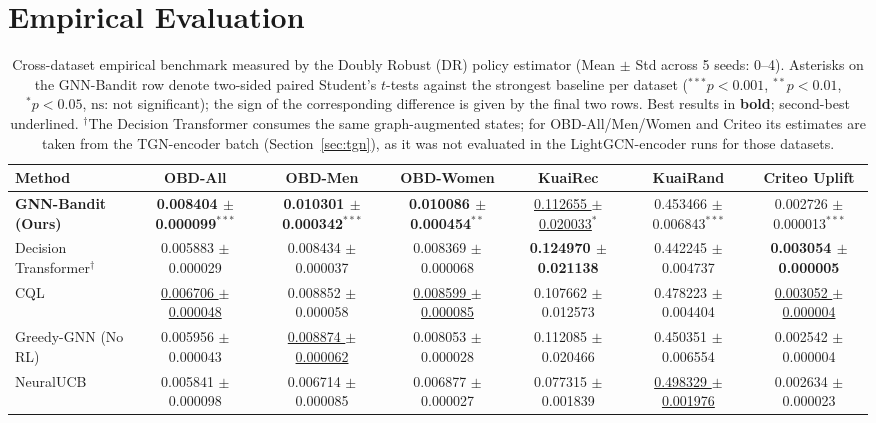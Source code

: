 \documentclass[preprint,12pt,3p]{elsarticle}
\begin{document}
\section{Empirical Evaluation}
\label{sec:experiments}

\begin{table}[t]
\centering
\small
\caption{Cross-dataset empirical benchmark measured by the Doubly Robust (DR) policy estimator (Mean $\pm$ Std across 5 seeds: 0--4). Asterisks on the GNN-Bandit row denote two-sided paired Student's $t$-tests against the strongest baseline per dataset ($^{***}p < 0.001$, $^{**}p < 0.01$, $^{*}p < 0.05$, $\text{ns}$: not significant); the sign of the corresponding difference is given by the final two rows. Best results in \textbf{bold}; second-best underlined. $^{\dagger}$The Decision Transformer consumes the same graph-augmented states; for OBD-All/Men/Women and Criteo its estimates are taken from the TGN-encoder batch (Section~\ref{sec:tgn}), as it was not evaluated in the LightGCN-encoder runs for those datasets.}
\label{tab:main_results}
\begin{tabular*}{\textwidth}{@{\extracolsep{\fill}}lcccccc@{}}
\toprule
\textbf{Method} & \textbf{OBD-All} & \textbf{OBD-Men} & \textbf{OBD-Women} & \textbf{KuaiRec} & \textbf{KuaiRand} & \textbf{Criteo Uplift} \\
\midrule
\textbf{GNN-Bandit (Ours)} & \textbf{0.008404 $\pm$ 0.000099}$^{***}$ & \textbf{0.010301 $\pm$ 0.000342}$^{***}$ & \textbf{0.010086 $\pm$ 0.000454}$^{**}$ & \underline{0.112655 $\pm$ 0.020033}$^{*}$ & 0.453466 $\pm$ 0.006843$^{***}$ & 0.002726 $\pm$ 0.000013$^{***}$ \\
Decision Transformer$^{\dagger}$ \cite{chen2021decision} & 0.005883 $\pm$ 0.000029 & 0.008434 $\pm$ 0.000037 & 0.008369 $\pm$ 0.000068 & \textbf{0.124970 $\pm$ 0.021138} & 0.442245 $\pm$ 0.004737 & \textbf{0.003054 $\pm$ 0.000005} \\
CQL \cite{kumar2020conservative} & \underline{0.006706 $\pm$ 0.000048} & 0.008852 $\pm$ 0.000058 & \underline{0.008599 $\pm$ 0.000085} & 0.107662 $\pm$ 0.012573 & 0.478223 $\pm$ 0.004404 & \underline{0.003052 $\pm$ 0.000004} \\
Greedy-GNN (No RL) & 0.005956 $\pm$ 0.000043 & \underline{0.008874 $\pm$ 0.000062} & 0.008053 $\pm$ 0.000028 & 0.112085 $\pm$ 0.020466 & 0.450351 $\pm$ 0.006554 & 0.002542 $\pm$ 0.000004 \\
NeuralUCB \cite{zhou2020neural} & 0.005841 $\pm$ 0.000098 & 0.006714 $\pm$ 0.000085 & 0.006877 $\pm$ 0.000027 & 0.077315 $\pm$ 0.001839 & \underline{0.498329 $\pm$ 0.001976} & 0.002634 $\pm$ 0.000023 \\

\end{tabular*}
\end{table}
\end{document}
